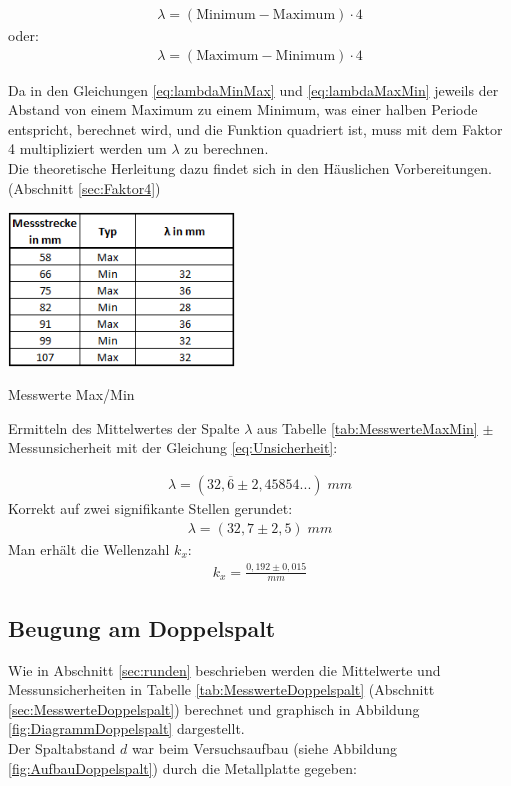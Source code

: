 \documentclass[a4paper]{scrartcl}
\numberwithin{equation}{subsection}
\begin{document}
\begin{align}
\lambda = (\text{Minimum} - \text{Maximum}) \cdot 4
\label{eq:lambdaMinMax}
\end{align}
oder:
\begin{align}
\lambda = (\text{Maximum} - \text{Minimum}) \cdot 4
\label{eq:lambdaMaxMin}
\end{align}

Da in den Gleichungen \ref{eq:lambdaMinMax} und \ref{eq:lambdaMaxMin} jeweils der Abstand von einem Maximum zu einem Minimum, was einer halben Periode entspricht, berechnet wird, und die Funktion quadriert ist, muss mit dem Faktor 4 multipliziert werden um $\lambda$ zu berechnen.\\
Die theoretische Herleitung dazu findet sich in den Häuslichen Vorbereitungen. (Abschnitt \ref{sec:Faktor4})\\

\begin{table}[H]
\includegraphics[width=6cm]{Tabelle_Max_Min}
\centering
\caption{Messwerte Max/Min}
\centering
\label{tab:MesswerteMaxMin}
\end{table}

Ermitteln des Mittelwertes der Spalte $\lambda$ aus Tabelle \ref{tab:MesswerteMaxMin} $\pm$ Messunsicherheit mit der Gleichung \ref{eq:Unsicherheit}:

\begin{align*}
\lambda = (32,\overline{6}\pm 2,45854...)\; mm
\end{align*}
Korrekt auf zwei signifikante Stellen gerundet:
\begin{align*}
\lambda = (32,7\pm 2,5)\; mm
\end{align*}
Man erhält die Wellenzahl $k_x$:
\begin{align*}
k_x = \frac{0,192\pm 0,015}{mm}
\end{align*}

\subsection{Beugung am Doppelspalt}
Wie in Abschnitt \ref{sec:runden} beschrieben werden die Mittelwerte und Messunsicherheiten in Tabelle \ref{tab:MesswerteDoppelspalt} (Abschnitt \ref{sec:MesswerteDoppelspalt}) berechnet und graphisch in Abbildung \ref{fig:DiagrammDoppelspalt} dargestellt.\\
Der Spaltabstand $d$ war beim Versuchsaufbau (siehe Abbildung \ref{fig:AufbauDoppelspalt}) durch die Metallplatte gegeben:
\end{document}
